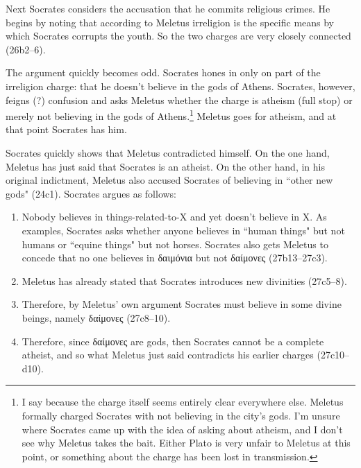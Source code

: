 \documentclass[11pt]{article}
\begin{document}
Next Socrates considers the accusation that he commits religious crimes.
He begins by noting that according to Meletus irreligion is the specific
means by which Socrates corrupts the youth.  So the two charges are very
closely connected (26b2--6).

The argument quickly becomes odd. Socrates hones in only on part of the
irreligion charge: that he doesn't believe in the gods of Athens.
Socrates, however, feigns (?) confusion and asks Meletus whether the charge
is atheism (full stop) or merely not believing in the gods of
Athens.\footnote{I say  because the charge itself seems
entirely clear everywhere else.  Meletus formally charged Socrates with not
believing in the city's gods.  I'm unsure where Socrates came up with the
idea of asking about atheism, and I don't see why Meletus takes the bait.
Either Plato is very unfair to Meletus at this point, or something about
the charge has been lost in transmission.} Meletus goes for atheism, and at
that point Socrates has him.

Socrates quickly shows that Meletus contradicted himself.  On the one hand,
Meletus has just said that Socrates is an atheist.  On the other hand, in
his original indictment, Meletus also accused Socrates of believing in
``other new gods" (24c1).  Socrates argues as follows:

\begin{enumerate}

    \item Nobody believes in things-related-to-X and yet doesn't believe in
        X.  As examples, Socrates asks whether anyone believes in ``human
        things" but not humans or ``equine things" but not horses.
        Socrates also gets Meletus to concede that no one believes in {\g
        δαιμόνια} but not {\g δαίμονες} (27b13--27c3).

    \item Meletus has already stated that Socrates introduces new
        divinities (27c5--8).

    \item Therefore, by Meletus' own argument Socrates must believe in some
        divine beings, namely {\g δαίμονες} (27c8--10).

    \item Therefore, since {\g δαίμονες} are gods, then Socrates cannot be
        a complete atheist, and so what Meletus just said contradicts his
        earlier charges (27c10--d10).

\end{enumerate}
\end{document}
